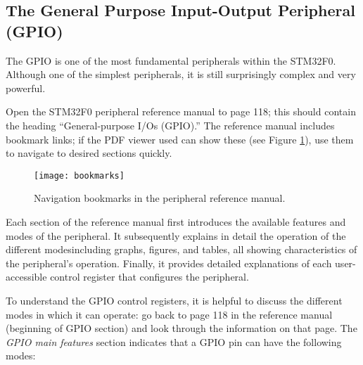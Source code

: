 \documentclass[openany,11pt,fleqn]{book} %
\begin{document}
\subsection{The General Purpose Input-Output Peripheral (GPIO)}


The GPIO is one of the most fundamental peripherals within the STM32F0. Although one of the simplest peripherals, it is still surprisingly complex and very powerful.

Open the STM32F0 peripheral reference manual to page 118; this should contain the heading ``General-purpose I/Os (GPIO).'' The reference manual includes bookmark links; if the PDF viewer used can show these (see Figure \ref{bookmarks}), use them to navigate to desired sections quickly.

\begin{figure}[]
    \centering\texttt{[image: bookmarks]}
    \caption{Navigation bookmarks in the peripheral reference manual.}
    \label{bookmarks}
\end{figure}

Each section of the reference manual first introduces the available features and modes of the peripheral. It subsequently explains in detail the operation of the different modes\textemdash including graphs, figures, and tables, all showing characteristics of the peripheral's operation. Finally, it provides detailed explanations of each user-accessible control register that configures the peripheral.

To understand the GPIO control registers, it is helpful to discuss the different modes in which it can operate: go back to page 118 in the reference manual (beginning of GPIO section) and look through the information on that page.
The \textit{GPIO main features} section indicates that a GPIO pin can have the following modes:
\end{document}
